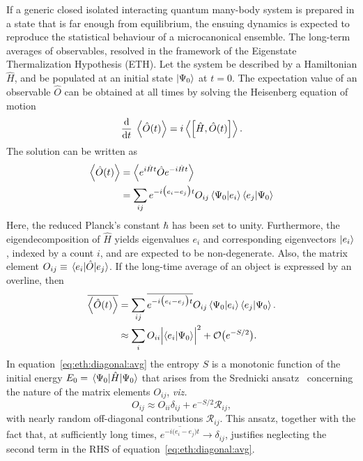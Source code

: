 \documentclass[%
reprint,
superscriptaddress,
amsmath,amssymb,
aps,
prb,
]{revtex4-2}
\begin{document}
	If a generic closed isolated interacting quantum many-body system is prepared in a state that is far enough from equilibrium, the ensuing dynamics is expected to reproduce the statistical behaviour of a microcanonical ensemble. The long-term averages of observables, resolved in the framework of the Eigenstate Thermalization Hypothesis (ETH)\cite{Joshua_2018, Nandkishore_2015}. Let the system be described by a Hamiltonian $\hat{H}$, and be populated at an initial state $\ket{\Psi_0}$ at $t=0$. The expectation value of an observable $\hat{O}$ can be obtained at all times by solving the Heisenberg equation of motion
	\begin{equation}
		\label{eq:heisenberg}
	\dv{t}\;\ev{\hat{O}(t)} = i \ev{\comm\Big{\hat{H}}{\hat{O}(t)}}.
	\end{equation}
	The solution can be written as
	\begin{align*}
		\expval{\hat{O}(t)} &= \expval{ e^{i\hat{H}t}\hat{O}e^{-i\hat{H}t}}\nonumber\\
		&= \sum_{ij}e^{-i\big(e_i-e_j\big)t}O_{ij}\ip{\Psi_0}{e_i}\ip{e_j}{\Psi_0}
	\end{align*}
	Here, the reduced Planck's constant $\hbar$ has been set to unity. Furthermore, the eigendecomposition of $\hat{H}$ yields eigenvalues $e_i$ and corresponding eigenvectors $\ket{e_i}$, indexed by a count $i$, and are expected to be non-degenerate. Also, the matrix element $O_{ij}\equiv \mel{e_i}{\hat{O}}{e_j}$. If the long-time average of an object is expressed by an overline, then
	\begin{align}
		\overline{\ev{\hat{O}(t)}} &= \sum_{ij}\overline{e^{-i\big(e_i-e_j\big)t}}O_{ij} \ip{\Psi_0}{e_i}\ip{e_j}{\Psi_0}.\nonumber\\
		&\approx\sum_i O_{ii} \abs\Big{ \ip{e_i}{\Psi_0}}^2 + \mathcal{O}\big(e^{-S/2}\big).
		\label{eq:eth:diagonal:avg}
	\end{align}
	In equation~\ref{eq:eth:diagonal:avg} the entropy $S$ is a monotonic function of the initial energy $E_0 = \expval{\hat{H}}{\Psi_0}$ that arises from the Srednicki ansatz~\cite{Srednicki_1999, Rigol_2012} concerning the nature of the matrix elements $O_{ij}$, \textit{viz.}
	\begin{equation*}
	O_{ij} \approx O_{ii}\delta_{ij} + e^{-S/2} \mathcal{R}_{ij},	
	\end{equation*}
with nearly random off-diagonal contributions $\mathcal{R}_{ij}$. This ansatz, together with the fact that, at sufficiently long times, $\overline{e^{-i\big(e_i-e_j\big)t}}\rightarrow \delta_{ij}$, justifies neglecting the second term in the RHS of equation~\ref{eq:eth:diagonal:avg}.
	
\end{document}
